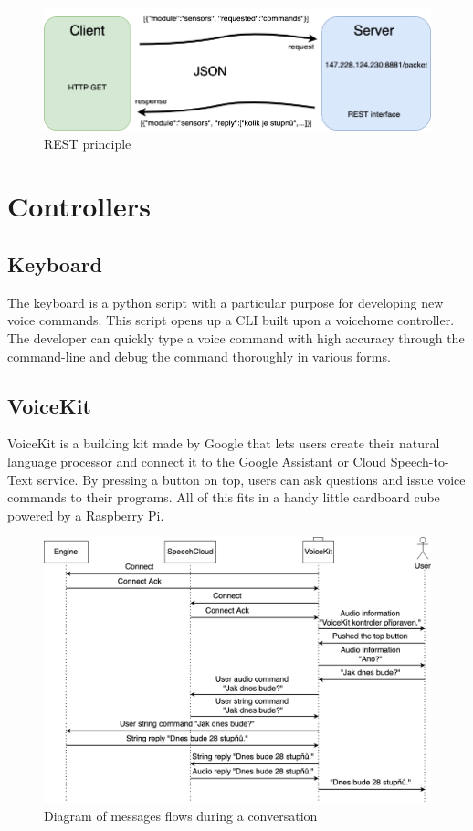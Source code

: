 \begin{figure}[H]
  \centering
  \includegraphics[width=\textwidth]{img/REST_schema.png}
  \caption{REST principle}
  \label{fig:REST_schema}
\end{figure}

\section{Controllers}

\subsection{Keyboard}

The keyboard is a python script with a particular purpose for developing new voice commands. This script opens up a CLI built upon a voicehome controller. The developer can quickly type a voice command with high accuracy through the command-line and debug the command thoroughly in various forms.

\subsection{VoiceKit}

VoiceKit is a building kit made by Google \citep{aiy_projects} that lets users create their natural language processor and connect it to the Google Assistant or Cloud Speech-to-Text service. By pressing a button on top, users can ask questions and issue voice commands to their programs. All of this fits in a handy little cardboard cube powered by a Raspberry Pi.

\begin{figure}[H]
	\centering
	\includegraphics[width=\textwidth]{img/message_flow.png}
	\caption{Diagram of messages flows during a conversation}
	\label{fig:message_flow}
\end{figure}

